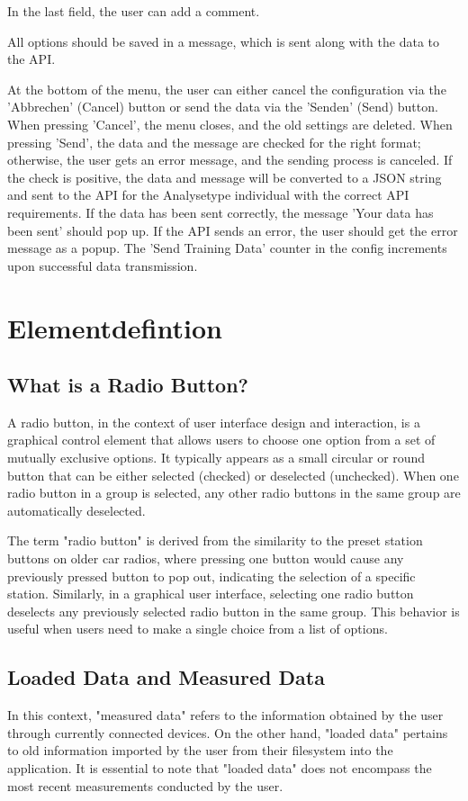 \documentclass{scrreprt}
\begin{document}
In the last field, the user can add a comment.

All options should be saved in a message, which is sent along with the data to the API.

At the bottom of the menu, the user can either cancel the configuration via the 'Abbrechen' (Cancel) button or send the data via the 'Senden' (Send) button.
 When pressing 'Cancel', the menu closes, and the old settings are deleted. When pressing 'Send', the data and the message are checked for the right format; otherwise, the user gets an error message, 
 and the sending process is canceled. If the check is positive, the data and message will be converted to a JSON string and sent to the API for the Analysetype individual with the correct API requirements. 
 If the data has been sent correctly, the message 'Your data has been sent' should pop up.
 If the API sends an error, the user should get the error message as a popup. The 'Send Training Data' counter in the config increments upon successful data transmission.

 \section{Elementdefintion}

\subsection{What is a Radio Button?}\label{cap:RadioButton}

A radio button, in the context of user interface design and interaction, is a graphical control element that allows users to choose one option from a set of mutually exclusive options. 
It typically appears as a small circular or round button that can be either selected (checked) or deselected (unchecked). 
When one radio button in a group is selected, any other radio buttons in the same group are automatically deselected.

The term "radio button" is derived from the similarity to the preset station buttons on older car radios, where pressing one button would cause any previously pressed button to pop out,
 indicating the selection of a specific station. Similarly, in a graphical user interface, selecting one radio button deselects any previously selected radio button in the same group. 
 This behavior is useful when users need to make a single choice from a list of options.

\subsection{Loaded Data and Measured Data}\label{cap:loadedData}
In this context, "measured data" refers to the information obtained by the user through currently connected devices. On the other hand, "loaded data" 
pertains to old information imported by the user from their filesystem into the application. It is essential to note that "loaded data" does not encompass the most recent measurements conducted by the user. 
\end{document}
